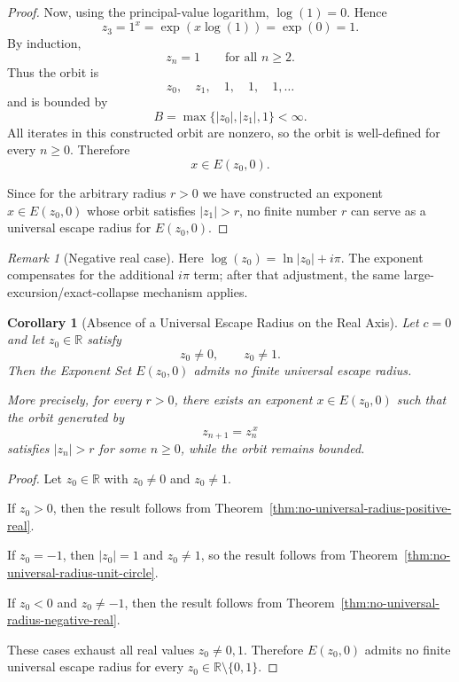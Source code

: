 \documentclass[12pt,a4paper]{amsart}
\newtheorem{corollary}[theorem]{Corollary}
\theoremstyle{remark}
\newtheorem{remark}{Remark}[section]
\newcommand{\R}{\mathbb{R}}
\begin{document}
\begin{proof}
Now, using the principal-value logarithm, $\log(1)=0$. Hence
\[
z_3
=
1^x
=
\exp(x\log(1))
=
\exp(0)
=
1.
\]
By induction,
\[
z_n=1
\qquad\text{for all }n\ge 2.
\]
Thus the orbit is
\[
z_0,\quad z_1,\quad 1,\quad 1,\quad 1,\ldots
\]
and is bounded by
\[
B=\max\{|z_0|,|z_1|,1\}<\infty.
\]
All iterates in this constructed orbit are nonzero, so the orbit is
well-defined for every $n\ge 0$. Therefore
\[
x\in E(z_0,0).
\]

Since for the arbitrary radius $r>0$ we have constructed an exponent
$x\in E(z_0,0)$ whose orbit satisfies $|z_1|>r$, no finite number $r$ can
serve as a universal escape radius for $E(z_0,0)$.
\end{proof}

\begin{remark}[Negative real case]
Here $\log(z_0)=\ln|z_0|+i\pi$. The exponent compensates for the additional
$i\pi$ term; after that adjustment, the same large-excursion/exact-collapse
mechanism applies.
\end{remark}

\medskip

\begin{corollary}[Absence of a Universal Escape Radius on the Real Axis]
\label{cor:no-universal-radius-real-axis}
Let $c=0$ and let $z_0\in\R$ satisfy
\[
z_0\ne 0,
\qquad
z_0\ne 1.
\]
Then the Exponent Set $E(z_0,0)$ admits no finite universal escape radius.

More precisely, for every $r>0$, there exists an exponent $x\in E(z_0,0)$
such that the orbit generated by
\[
z_{n+1}=z_n^{\,x}
\]
satisfies $|z_n|>r$ for some $n\ge 0$, while the orbit remains bounded.
\end{corollary}

\begin{proof}
Let $z_0\in\R$ with $z_0\ne 0$ and $z_0\ne 1$.

If $z_0>0$, then the result follows from
Theorem~\ref{thm:no-universal-radius-positive-real}.

If $z_0=-1$, then $|z_0|=1$ and $z_0\ne 1$, so the result follows from
Theorem~\ref{thm:no-universal-radius-unit-circle}.

If $z_0<0$ and $z_0\ne -1$, then the result follows from
Theorem~\ref{thm:no-universal-radius-negative-real}.

These cases exhaust all real values $z_0\ne 0,1$. Therefore
$E(z_0,0)$ admits no finite universal escape radius for every
$z_0\in\R\setminus\{0,1\}$.
\end{proof}
\end{document}
